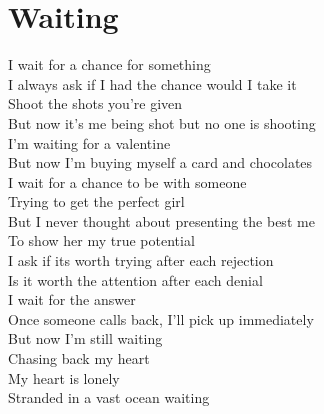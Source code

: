 \documentclass[12pt, b5paper, oneside]{book}
\begin{document}
\section{Waiting}
I wait for a chance for something 
\\I always ask if I had the chance would I take it 
\\Shoot the shots you're given 
\\But now it's me being shot but no one is shooting 
\\I'm waiting for a valentine 
\\But now I'm buying myself a card and chocolates
\\I wait for a chance to be with someone 
\\Trying to get the perfect girl
\\But I never thought about presenting the best me 
\\To show her my true potential
\\I ask if its worth trying after each rejection
\\Is it worth the attention after each denial
\\I wait for the answer 
\\Once someone calls back, I'll pick up immediately 
\\But now I'm still waiting 
\\Chasing back my heart
\\My heart is lonely 
\\Stranded in a vast ocean waiting 
\newpage
\end{document}
